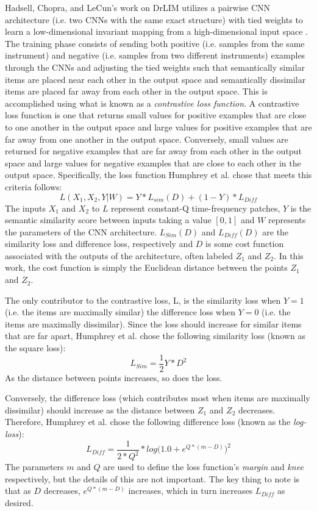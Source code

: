 \documentclass[12pt]{report} 	%
\numberwithin{figure}{chapter}
\numberwithin{table}{chapter}
\numberwithin{equation}{chapter}
\begin{document}
\begin{flushleft}
Hadsell, Chopra, and LeCun's work on DrLIM utilizes a pairwise CNN architecture (i.e. two CNNs with the same exact structure) with tied weights to learn a low-dimensional invariant mapping from a high-dimensional input space \cite{hadsell2006dimensionality}. The training phase consists of sending both positive (i.e. samples from the same instrument) and negative (i.e. samples from two different instruments) examples through the CNNs and adjusting the tied weights such that semantically similar items are placed near each other in the output space and semantically dissimilar items are placed far away from each other in the output space. This is accomplished using what is known as a \textit{contrastive loss function}. A contrastive loss function is one that returns small values for positive examples that are close to one another in the output space and large values for positive examples that are far away from one another in the output space. Conversely, small values are returned for negative examples that are far away from each other in the output space and large values for negative examples that are close to each other in the output space. Specifically, the loss function Humphrey et al. chose that meets this criteria follows:
\begin{equation}
L(X_1, X_2, Y|W)=Y*L_{sim}(D)+(1-Y)*L_{Diff}
\end{equation}
The inputs $X_1$ and $X_2$ to $L$ represent constant-Q time-frequency patches, $Y$ is the semantic similarity score between inputs taking a value $[0,1]$ and $W$ represents the parameters of the CNN architecture. $L_{Sim}(D)$ and $L_{Diff}(D)$ are the similarity loss and difference loss, respectively and $D$ is some cost function associated with the outputs of the architecture, often labeled $Z_1$ and $Z_2$. In this work, the cost function is simply the Euclidean distance between the points $Z_1$ and $Z_2$.

The only contributor to the contrastive loss, L, is the similarity loss when $Y=1$ (i.e. the items are maximally similar) the difference loss when $Y=0$ (i.e. the items are maximally dissimilar). Since the loss should increase for similar items that are far apart, Humphrey et al. chose the following similarity loss (known as the square loss):
\begin{equation}
L_{Sim}=\frac{1}{2}Y*D^2
\end{equation}
As the distance between points increases, so does the loss. 

Conversely, the difference loss (which contributes most when items are maximally dissimilar) should increase as the distance between $Z_1$ and $Z_2$ decreases. Therefore, Humphrey et al. chose the following difference loss (known as the \textit{log-loss}):
\begin{equation}
L_{Diff}=\frac{1}{2*Q^2}*log\Big(1.0+e^{Q*(m-D)}\Big)^2
\end{equation}
The parameters $m$ and $Q$ are used to define the loss function's \textit{margin} and \textit{knee} respectively, but the details of this are not important. The key thing to note is that as $D$ decreases, $e^{Q*(m-D)}$ increases, which in turn increases $L_{Diff}$ as desired.


\end{flushleft}
\end{document}
